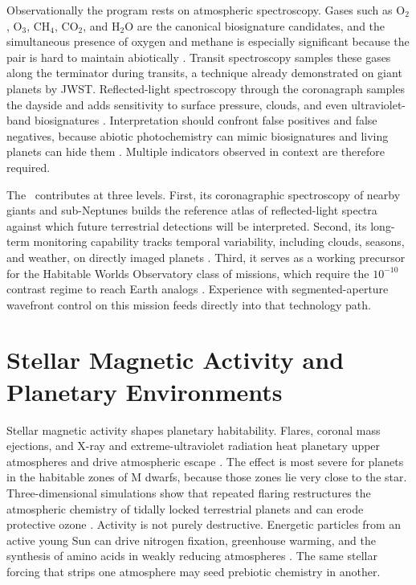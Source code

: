 Observationally the program rests on atmospheric spectroscopy. Gases
such as O$_2$, O$_3$, CH$_4$, CO$_2$, and H$_2$O are the canonical
biosignature candidates, and the simultaneous presence of oxygen and
methane is especially significant because the pair is hard to maintain
abiotically \cite{schwieterman18,claudi19}. Transit spectroscopy
samples these gases along the terminator during transits, a technique
already demonstrated on giant planets by JWST. Reflected-light
spectroscopy through the coronagraph samples the dayside and adds
sensitivity to surface pressure, clouds, and even ultraviolet-band
biosignatures \cite{damiano23}. Interpretation should confront
false positives and false negatives, because abiotic photochemistry can
mimic biosignatures and living planets can hide them
\cite{schwieterman18,robinson18}. Multiple indicators observed in
context are therefore required.

The \facility\ contributes at three levels. First, its coronagraphic
spectroscopy of nearby giants and sub-Neptunes builds the reference
atlas of reflected-light spectra against which future terrestrial
detections will be interpreted. Second, its long-term monitoring
capability tracks temporal variability, including clouds, seasons, and
weather, on directly imaged planets \cite{robinson18}. Third, it
serves as a working precursor for the Habitable Worlds Observatory
class of missions, which require the $10^{-10}$ contrast regime to
reach Earth analogs \cite{hwo26}. Experience with
segmented-aperture wavefront control on this mission feeds directly into
that technology path.

\section{Stellar Magnetic Activity and Planetary Environments}
\label{sec:activity}

Stellar magnetic activity shapes planetary habitability. Flares,
coronal mass ejections, and X-ray and extreme-ultraviolet radiation
heat planetary upper atmospheres and drive atmospheric escape
\cite{airapetian17escape}. The effect is most severe for planets in the habitable
zones of M dwarfs, because those zones lie very close to the star.
Three-dimensional simulations show that repeated flaring restructures
the atmospheric chemistry of tidally locked terrestrial planets and can
erode protective ozone \cite{ridgway23,chen21}. Activity is not purely
destructive. Energetic particles from an active young Sun can drive
nitrogen fixation, greenhouse warming, and the synthesis of amino
acids in weakly reducing atmospheres \cite{airapetian16,kobayashi23}.
The same stellar forcing that strips one atmosphere may seed prebiotic
chemistry in another.

